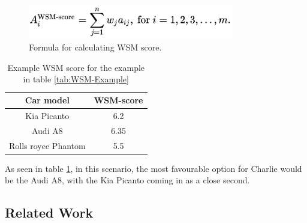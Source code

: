 \begin{figure}[ht]
	\centering 
    \includegraphics[width=0.8\textwidth]{img/wsm_score_formula.png}
	\hfill
	\caption{\label{fig:WSM-formula}{Formula for calculating WSM score.}}

\end{figure}

\begin{table}[ht]
    \centering
    \begin{tabular}{ |c|c| } 
        \hline
        \rowcolor{light-gray}
        Car model & WSM-score \\
        \hline
        Kia Picanto & 6.2 \\
        \hline
        Audi A8 & 6.35 \\
        \hline
        Rolls royce Phantom & 5.5 \\
        \hline
    \end{tabular}
    \caption{\label{tab:WSM-score}Example WSM score for the example in table \ref{tab:WSM-Example}}
\end{table}

As seen in table \ref{tab:WSM-score}, in this scenario, the most favourable option for Charlie would be the Audi A8, with the Kia Picanto coming in as a close second.

\subsection{Related Work}
